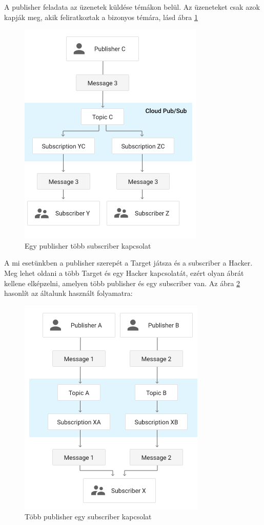 \documentclass[12pt,a4paper,oneside]{report}
\begin{document}
A publisher feladata az üzenetek küldése témákon belül. Az üzeneteket csak azok kapják meg, akik feliratkoztak a bizonyos témára, lásd ábra \ref{fig:pubsub}
\begin{figure}[H]
\centering
\includegraphics{../images/pubsubrel}
\caption{ Egy publisher több subscriber kapcsolat}
\label{fig:pubsub}
\end{figure}
A mi esetünkben a publisher szerepét a Target játsza és a subscriber a Hacker. Meg lehet oldani a több Target és egy Hacker kapcsolatát, ezért olyan ábrát kellene elképzelni, amelyen több publisher és egy subscriber van. Az ábra \ref{fig:pubsub2} hasonlít az általunk használt folyamatra:
\begin{figure}[H]
\centering
\includegraphics{../images/pubsubrel2}
\caption{Több publisher egy subscriber kapcsolat}
\label{fig:pubsub2}
\end{figure}
\end{document}
